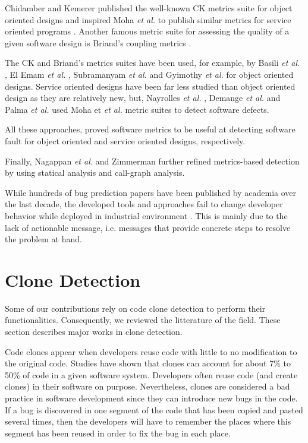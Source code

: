 Chidamber and Kemerer published the well-known CK metrics suite \cite{Chidamber1994} for object oriented designs and inspired Moha \textit{et al.} to publish similar metrics for service oriented programs \cite{Moha}.
Another famous metric suite for assessing the quality of a given software design is Briand's coupling metrics \cite{Briand1999a}.

The CK and Briand's metrics suites have been used, for example, by Basili \textit{et al.} \cite{Basili1996}, El Emam \textit{et al.} \cite{ElEmam2001},  Subramanyam \textit{et al.} \cite{Subramanyam2003} and Gyimothy \textit{et al.} \cite{Gyimothy2005} for object oriented designs.
Service oriented designs have been far less studied than object oriented design as they are relatively new, but, Nayrolles \textit{et al.} \cite{Nayrolles,Nayrolles2013d}, Demange \textit{et al.} \cite{demange2013} and Palma \textit{et al.} \cite{Palma2013} used Moha et \textit{et al.} metric suites to detect software defects.

All these approaches, proved software metrics to be useful at detecting software fault for object oriented and service oriented designs, respectively.

Finally, Nagappan \textit{et al.} \cite{Nagappan2005,Nagappan2006} and Zimmerman \cite{Zimmermann2007,Zimmermann2008} further refined metrics-based detection by using statical analysis and call-graph analysis.

While hundreds of bug prediction papers have been published by academia over the last decade, the developed tools and approaches fail to change developer behavior while deployed in industrial environment \cite{Lewis2013}.
This is mainly due to the lack of actionable message, i.e. messages that provide concrete steps to resolve the problem at hand.

\section{Clone Detection}
\label{sec:rel-clones}

Some of our contributions rely on code clone detection to perform their functionalities.
Consequently, we reviewed the litterature of the field.
These section describes major works in clone detection.

Code clones appear when developers reuse code with little to no modification to the original code.
Studies have shown  that clones can account for about 7\% to 50\% of code in a given software system\cite{Baker, StephaneDucasse}.
Developers often reuse code (and create clones) in their software on purpose\cite{Kim2005}.
Nevertheless, clones are considered a bad practice in software development since they can introduce new bugs in the code\cite{Kapser2006,Juergens2009,Li2006}.
If a  bug is discovered in one segment of the code that has been copied and pasted several times, then the developers will have to remember the places where this segment has been reused in order to fix the bug in each place.

